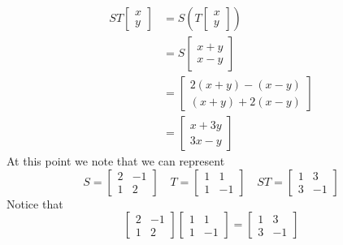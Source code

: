\documentclass[10pt]{article}
\theoremstyle{definition}
\begin{document}
\begin{align*}
  ST
  \begin{bmatrix}
    x\\y
  \end{bmatrix}
  &=S \left( T
    \begin{bmatrix}
      x\\y
    \end{bmatrix}
    \right)\\ 
  &=S
    \begin{bmatrix}
      x+y\\
      x-y
    \end{bmatrix}\\
  &=
    \begin{bmatrix}
      2(x+y)-(x-y)\\
      (x+y)+2(x-y)
    \end{bmatrix}\\
  &=
    \begin{bmatrix}
      x+3y\\
      3x-y
    \end{bmatrix}
\end{align*}
At this point we note that we can represent
\begin{equation*}
  S
  =
  \begin{bmatrix}
    2&-1\\
    1&2
  \end{bmatrix}
  \quad
  T =
  \begin{bmatrix}
    1&1\\
    1&-1
  \end{bmatrix}
  \quad
  ST
  =
  \begin{bmatrix}
    1&3\\3&-1
  \end{bmatrix}
\end{equation*}
Notice that
\begin{equation*}
  \begin{bmatrix}
    2&-1\\
    1&2
  \end{bmatrix}
  \begin{bmatrix}
    1&1\\
    1&-1
  \end{bmatrix}
  =
  \begin{bmatrix}
    1&3\\3&-1
  \end{bmatrix}
\end{equation*}
\end{document}
